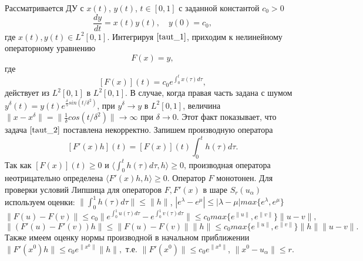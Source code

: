 Рассматривается ДУ с $x(t)$, $y(t)$, $t\in[0, 1]$ с заданной константой $c_0>0$
\begin{equation}\label{taut_1}
\frac{dy}{dt}=x(t)y(t), \quad y(0)=c_0,
\end{equation}
где $x(t), y(t)\in L^2[0,1]$. Интегрируя $\eqref{taut_1}$, приходим к нелинейному операторному уравнению
\begin{equation}\label{taut_2}
F(x)=y,
\end{equation}
где $$[F(x)](t)=c_0 e^{\int_{0}^{t}x(\tau)d\tau},$$
действует из $L^2[0,1]$ в $L^2[0,1]$. В случае, когда правая часть задана с шумом $y^\delta(t)=y(t)e^{\frac{\delta}{5} sin(t/{\delta}^2)}$, при $y^\delta\to y$ в $L^2[0,1]$, величина $\|x-x^\delta\|=\|\frac{1}{\delta}cos(t/{\delta}^2)\|\to\infty$ при $\delta\to 0$. Этот факт показывает, что задача $\eqref{taut_2}$ поставлена некорректно. Запишем производную оператора
\begin{equation}\label{taut_3}
[F'(x)h](t)=[F(x)](t)\int_{0}^{t}h(\tau)d\tau.
\end{equation}
Так как $[F(x)](t)\ge 0$ и $\langle\int_{0}^{t}h(\tau)d\tau, h\rangle\ge 0$, производная оператора неотрицательно определена $\langle F'(x)h, h\rangle\ge 0$. Оператор $F$ монотонен. Для проверки условий Липшица для операторов $F, F'(x)$ в шаре $S_r(u_\alpha)$ используем оценки: $\|\int_{0}^{1}h(\tau)d\tau\|\le\|h\|$, $|e^\lambda-e^\mu|\le|\lambda-\mu|max\{e^\lambda, e^\mu\}$
$$\|F(u)-F(v)\|\le c_0\|e^{\int_{0}^{1}u(\tau)d\tau}-e^{\int_{0}^{1}v(\tau)d\tau}\|
\le c_0 max\{e^{\|u\|},e^{\|v\|}\}\|u-v\|,$$
$$\|(F'(u)-F'(v))h\|\le\|F(u)-F(v)\|\|h\|\le c_0 max\{e^{\|u\|},e^{\|v\|}\}\|h\|\|u-v\|.$$
Также имеем оценку нормы производной в начальном приближении $\|F'(x^0)h\|\le c_0 e^{\|x^0\|}\|h\|,$ т.е. $\|F'(x^0)\|\le c_0 e^{\|x^0\|}$, $\|x^0-u_\alpha\|\le r$.

